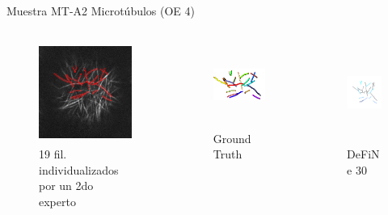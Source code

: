 \begin{frame}{Muestra MT-A2 Microt\'ubulos (OE 4)}
\vspace{-1cm}
    \begin{columns}
        \begin{column}{0.22\textwidth}
            \begin{figure}
                \centering
                \includegraphics[height=1.3in]{Pictures/Slice6-SPINNING-DISK-MARCHANTIA-1-PL.png}
                \caption{19 fil. individualizados por un 2do experto}
            \end{figure}
        \end{column}
        \begin{column}{0.22\textwidth}
            \begin{figure}
                \centering
                \includegraphics[height=1.1in]{Pictures/Slice6-Spinning-PL-gtruth-preSkel-BW-littleClean-ground-truth-no-label-ants.png}
                \caption{Ground Truth}
            \end{figure}
        \end{column}
        \begin{column}{0.22\textwidth}
            \begin{figure}
                \centering
                \includegraphics[height=1.3in]{Pictures/Slice6-Spinning-PL-DeFiNeExactMatch-60.png}
                \caption{DeFiNe 30\textdegree}
            \end{figure}
        \end{column}

\end{columns}
\end{frame}
